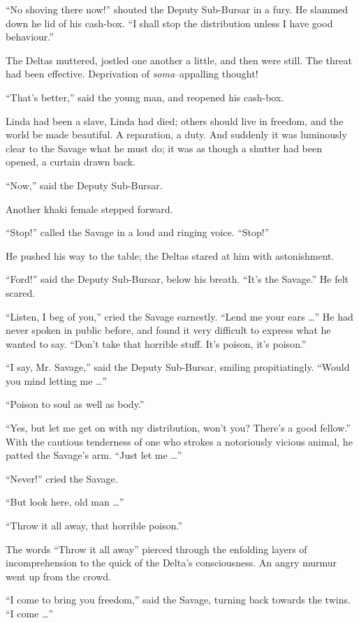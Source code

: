 \documentclass[12pt]{report}
\begin{document}
``No shoving there now!'' shouted the Deputy Sub-Bursar in a fury. He
slammed down he lid of his cash-box. ``I shall stop the distribution
unless I have good behaviour.''

The Deltas muttered, jostled one another a little, and then were still.
The threat had been effective. Deprivation of \emph{soma}--appalling
thought!

``That's better,'' said the young man, and reopened his cash-box.

Linda had been a slave, Linda had died; others should live in freedom,
and the world be made beautiful. A reparation, a duty. And suddenly it
was luminously clear to the Savage what he must do; it was as though a
shutter had been opened, a curtain drawn back.

``Now,'' said the Deputy Sub-Bursar.

Another khaki female stepped forward.

``Stop!'' called the Savage in a loud and ringing voice. ``Stop!''

He pushed his way to the table; the Deltas stared at him with
astonishment.

``Ford!'' said the Deputy Sub-Bursar, below his breath. ``It's the
Savage.'' He felt scared.

``Listen, I beg of you,'' cried the Savage earnestly. ``Lend me your
ears \ldots{}'' He had never spoken in public before, and found it very
difficult to express what he wanted to say. ``Don't take that horrible
stuff. It's poison, it's poison.''

``I say, Mr. Savage,'' said the Deputy Sub-Bursar, smiling
propitiatingly. ``Would you mind letting me \ldots{}''

``Poison to soul as well as body.''

``Yes, but let me get on with my distribution, won't you? There's a good
fellow.'' With the cautious tenderness of one who strokes a notoriously
vicious animal, he patted the Savage's arm. ``Just let me \ldots{}''

``Never!'' cried the Savage.

``But look here, old man \ldots{}''

``Throw it all away, that horrible poison.''

The words ``Throw it all away'' pierced through the enfolding layers of
incomprehension to the quick of the Delta's consciousness. An angry
murmur went up from the crowd.

``I come to bring you freedom,'' said the Savage, turning back towards
the twins. ``I come \ldots{}''
\end{document}
